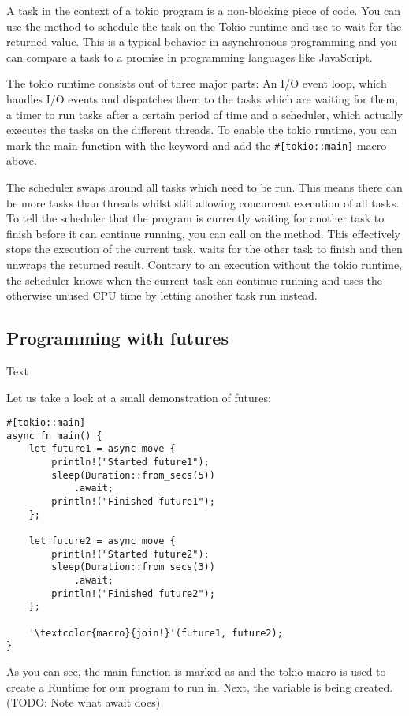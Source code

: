 A task in the context of a tokio program is a non-blocking piece of code. You can use the 
method to schedule the task on the Tokio runtime and use  to wait for the returned value. This is a typical
behavior in asynchronous programming and you can compare a task to a promise in programming languages like JavaScript.

The tokio runtime consists out of three major parts: An I/O event loop, which handles I/O events and dispatches them to
the tasks which are waiting for them, a timer to run tasks after a certain period of time and  a scheduler, which
actually executes the tasks on the different threads. To enable the tokio runtime, you can mark the main function with
the  keyword and add the \texttt{#[tokio::main]} macro above.

The scheduler swaps around all tasks which need to be run. This means there can be more tasks than threads whilst still
allowing concurrent execution of all tasks. To tell the scheduler that the program is currently waiting for another
task to finish before it can continue running, you can call  on the method. This effectively stops the
execution of the current task, waits for the other task to finish and then unwraps the returned result. Contrary to an
execution without the tokio runtime, the scheduler knows when the current task can continue running and uses the
otherwise unused CPU time by letting another task run instead.

\subsection{Programming with futures}
Text

Let us take a look at a small demonstration of futures:

\begin{verbatim}
#[tokio::main]
async fn main() {
    let future1 = async move {
        println!("Started future1");
        sleep(Duration::from_secs(5))
            .await;
        println!("Finished future1");
    };

    let future2 = async move {
        println!("Started future2");
        sleep(Duration::from_secs(3))
            .await;
        println!("Finished future2");
    };

    '\textcolor{macro}{join!}'(future1, future2);
}
\end{verbatim}

As you can see, the main function is marked as  and the tokio macro is used to create a Runtime for our
program to run in. Next, the variable  is being created. (TODO: Note what await does)

